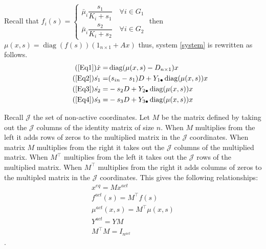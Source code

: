 \documentclass[processes,article,submit,moreauthors,pdftex]{Definitions/mdpi}
\DeclareMathOperator{\diag}{diag}
\begin{document}
Recall that $ f_i(s) = \begin{cases}
\bar{\mu}_i \dfrac{s_1}{K_i + s_1} \quad \forall i \in G_1 \\
\bar{\mu}_i \dfrac{s_2}{K_i + s_2} \quad \forall i \in G_2
\end{cases}$ then $\mu(x,s) = \diag(f(s))(1_{n\times 1} + Ax)$ thus, system \eqref{system} is rewritten as follows. 
\begin{align}
\tag{\ref{Eq1}}	\dot{x} = & \diag(\mu(x,s) - D_{n\times 1})x \\
\tag{\ref{Eq2}}	\dot{s_1} = & (s_{in}-s_1)D + Y_{1\bullet} \diag(\mu(x,s))x \\
\tag{\ref{Eq3}}	\dot{s_2} = & -s_2D+
Y_{2\bullet} \diag(\mu(x,s))x\\	
\tag{\ref{Eq4}}	\dot{s_3} = & -s_3D+Y_{3\bullet} \diag(\mu(x,s))x 
\end{align} 

Recall $\mathcal{J}$ the set of non-active coordinates. Let $M$ be the matrix defined by taking out the $\mathcal{J}$ columns of the identity matrix of size $n$. When $M$ multiplies from the left it adds rows of zeros to the multiplied matrix in the $\mathcal{J}$ coordinates. When matrix $M$ multiplies from the right it takes out the $\mathcal{J}$ columns of the multiplied matrix. When $M^\top$ multiplies from the left it takes out the $\mathcal{J}$ rows of the multiplied matrix. When $M^{\top}$ multiplies from the right it adds columns of zeros to the multipled matrix in the $\mathcal{J}$ coordinates. This gives the following relationships:
\begin{align}
x^{eq} = Mx^{act} \\	
f^{act}(s) = M^{\top}f(s) \\
\mu^{act}(x,s) = M^{\top}\mu(x,s)\\
Y^{act} = YM \\
M^\top M = I_{n^{act}}
\end{align}.   
\end{document}
